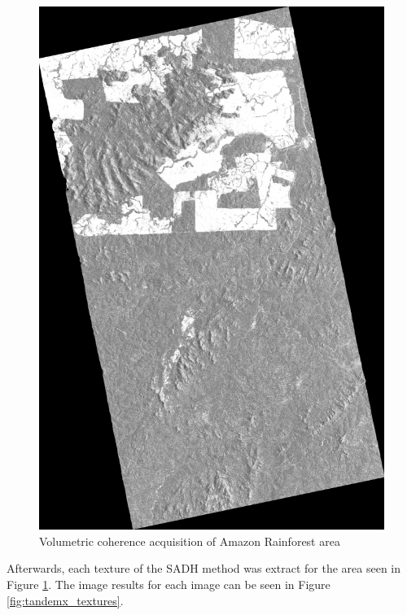 \begin{figure}[H]
    \centering
    \includegraphics[width=0.4\linewidth]{Cap3-Results/coSSC_master_gamma_vol.png}
    \caption{Volumetric coherence acquisition of Amazon Rainforest area}
    \label{fig:gamma_vol_tandemx}
\end{figure}

Afterwards, each texture of the SADH method was extract for the area seen in Figure \ref{fig:gamma_vol_tandemx}. The image results for each image can be seen in Figure \ref{fig:tandemx_textures}.

